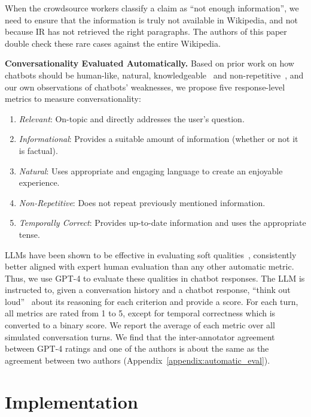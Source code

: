 \documentclass[11pt]{article}
\begin{document}
When the crowdsource workers classify a claim as ``not enough information'', we need to ensure that the information is truly not available in Wikipedia, and not because IR has not retrieved the right paragraphs. The authors of this paper double check these rare cases against the entire Wikipedia.

{\bf Conversationality Evaluated Automatically.}
\label{sec:auto_eval}
Based on prior work on how chatbots should be human-like, natural, knowledgeable~\cite{li2019acuteeval} and non-repetitive~\cite{roller-etal-2021-recipes}, and our own observations of chatbots' weaknesses,
we propose five response-level metrics to measure conversationality:
\begin{enumerate}[topsep=0pt,noitemsep]
    \item 
{\em Relevant}: On-topic and directly addresses the user’s question.
    \item 
{\em Informational}: Provides a suitable amount of information (whether or not it is factual).
   \item 
{\em Natural}: Uses appropriate and engaging language to create an enjoyable experience.
    \item 
{\em Non-Repetitive}: Does not repeat previously mentioned information.
    \item
{\em Temporally Correct}: Provides up-to-date information and uses the appropriate tense.
\end{enumerate}

LLMs have been shown to be effective in evaluating soft qualities~\cite{chiang2023large, he2023annollm, kocmi2023large, liu2023geval, finch-etal-2023-leveraging}, consistently better aligned with expert human evaluation than any other automatic metric.
Thus, we use GPT-4 to evaluate these qualities in chatbot responses.
The LLM is instructed to, given a conversation history and a chatbot response, ``think out loud''~\cite{chain-of-thought} about its reasoning for each criterion and provide a score. For each turn, all metrics are rated from 1 to 5, except for temporal correctness which is converted to a binary score. We report the average of each metric over all simulated conversation turns. 
We find that the inter-annotator agreement between GPT-4 ratings and one of the authors is about the same as the agreement between two authors (Appendix~\ref{appendix:automatic_eval}).


\section{Implementation}
\label{sec:experiment}
\end{document}
